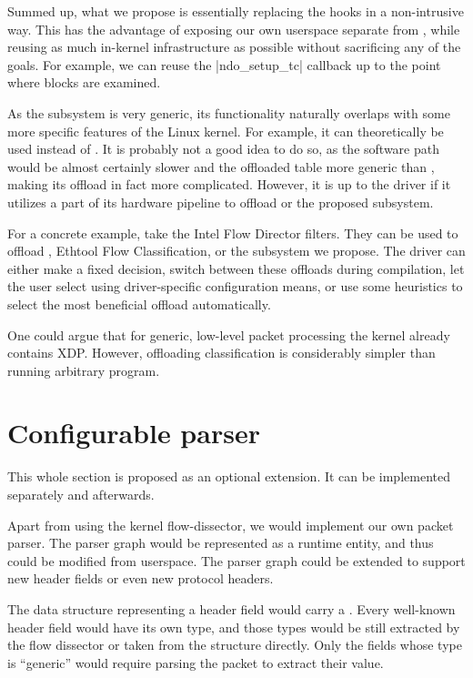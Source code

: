 Summed up, what we propose is essentially replacing the  hooks in
a non-intrusive way. This has the advantage of exposing our own userspace
 separate from , while reusing as much in-kernel infrastructure as
possible without sacrificing any of the goals. For example, we can reuse the
\fnc|ndo_setup_tc| callback up to the point where blocks are examined.


As the subsystem is very generic, its functionality naturally overlaps with
some more specific features of the Linux kernel. For example, it can
theoretically be used instead of . It is probably not a good idea to do
so, as the software path would be almost certainly slower and the offloaded
table more generic than , making its offload in fact more complicated.
However, it is up to the driver if it utilizes a part of its hardware pipeline
to offload  or the proposed subsystem.

For a concrete example, take the Intel Flow Director filters. They can be used
to offload , Ethtool Flow Classification, or the subsystem we propose.
The driver can either make a fixed decision, switch between these offloads
during compilation, let the user select using driver-specific configuration
means, or use some heuristics to select the most beneficial offload
automatically.

One could argue that for generic, low-level packet processing the kernel
already contains \acrfull{XDP}. However, offloading classification is
considerably simpler than running arbitrary  program.

\section{Configurable parser}
\label{rfc:parser}

This whole section is proposed as an optional extension. It can be implemented
separately and afterwards.

Apart from using the kernel flow-dissector, we would implement our own packet
parser. The parser graph would be represented as a runtime entity, and thus
could be modified from userspace. The parser graph could be extended to support
new header fields or even new protocol headers.

The data structure representing a header field would carry a .
Every well-known header field would have its own type, and those types would be
still extracted by the flow dissector or taken from the \skb{} structure directly.
Only the fields whose type is ``generic'' would require parsing the packet
to extract their value.

